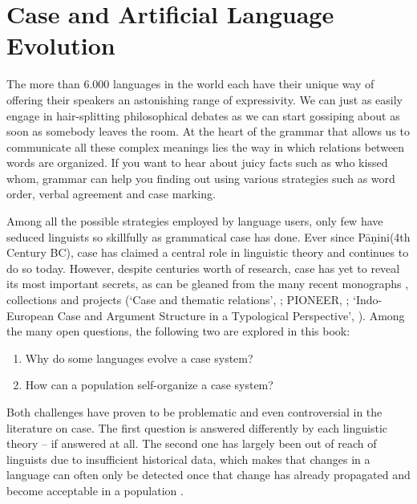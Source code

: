 
\chapter{Case and Artificial Language Evolution}

The more than 6.000 languages in the world each have their unique way of offering their speakers an astonishing range of expressivity. We can just as easily engage in hair-splitting philosophical debates as we can start gossiping about as soon as somebody leaves the room. At the heart of the grammar that allows us to communicate all these complex meanings lies the way in which relations between words are organized. If you want to hear about juicy facts such as who kissed whom, grammar can help you finding out using various strategies such as word order, verbal agreement and case marking.

Among all the possible strategies employed by language users, only few have seduced linguists so skillfully as grammatical case has done. Ever since P\={a}\d{n}ini(4th Century BC), case has claimed a central role in linguistic theory and continues to do so today. However, despite centuries worth of research, case has yet to reveal its most important secrets, as can be gleaned from the many recent monographs \citep{blake94case,butt06theories}, collections \citep{kulikov06casebook,barddal09casebook,malchukov09case} and projects (`Case and thematic relations', \citealp{davidse96functional}; PIONEER, \citealp{amberber05competition}; `Indo-European Case and Argument Structure in a Typological Perspective', \citealp{barddal09case}). 
Among the many open questions, the following two are explored in this book:

\begin{enumerate}
\item Why do some languages evolve a case system?
\item How can a population self-organize a case system?
\end{enumerate}

Both challenges have proven to be problematic and even controversial in the literature on case. The first question is answered differently by each linguistic theory -- if answered at all. The second one has largely been out of reach of linguists due to insufficient historical data, which makes that changes in a language can often only be detected once that change has already propagated and become acceptable in a population \citep[34--35]{croft91syntactic}.

